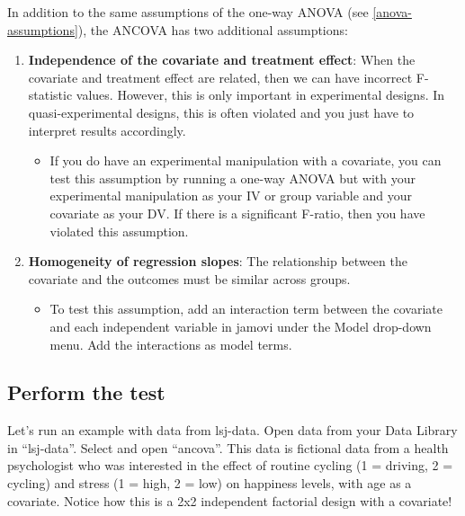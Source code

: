 \documentclass[
]{book}
\providecommand{\tightlist}{%
  \setlength{\itemsep}{0pt}\setlength{\parskip}{0pt}}
\begin{document}
In addition to the same assumptions of the one-way ANOVA (see \ref{anova-assumptions}), the ANCOVA has two additional assumptions:

\begin{enumerate}
\def\labelenumi{\arabic{enumi}.}
\item
  \textbf{Independence of the covariate and treatment effect}: When the covariate and treatment effect are related, then we can have incorrect F-statistic values. However, this is only important in experimental designs. In quasi-experimental designs, this is often violated and you just have to interpret results accordingly.

  \begin{itemize}
  \tightlist
  \item
    If you do have an experimental manipulation with a covariate, you can test this assumption by running a one-way ANOVA but with your experimental manipulation as your IV or group variable and your covariate as your DV. If there is a significant F-ratio, then you have violated this assumption.
  \end{itemize}
\item
  \textbf{Homogeneity of regression slopes}: The relationship between the covariate and the outcomes must be similar across groups.

  \begin{itemize}
  \tightlist
  \item
    To test this assumption, add an interaction term between the covariate and each independent variable in jamovi under the Model drop-down menu. Add the interactions as model terms.
  \end{itemize}
\end{enumerate}

\hypertarget{perform-the-test-8}{%
\subsection{Perform the test}\label{perform-the-test-8}}

Let's run an example with data from lsj-data. Open data from your Data Library in ``lsj-data''. Select and open ``ancova''. This data is fictional data from a health psychologist who was interested in the effect of routine cycling (1 = driving, 2 = cycling) and stress (1 = high, 2 = low) on happiness levels, with age as a covariate. Notice how this is a 2x2 independent factorial design with a covariate!
\end{document}
